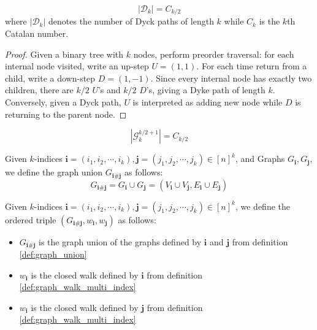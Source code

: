 \begin{proposition}
  \notready
  \label{prop:Catalan_Dyck_samecardinality}
  \[|\mathcal{D}_k| = C_{k/2} \] where $|\mathcal{D}_k|$ denotes the number of Dyck paths of length $k$ while
  $C_k$ is the $k$th Catalan number.
\end{proposition}

\begin{proof}
  \notready
  Given a binary tree with $k$ nodes, perform preorder traversal: for each internal node visited, write
  an up-step \(U = (1,1)\). For each time return from a child, write a down-step \(D = (1,-1)\).
  Since every internal node has exactly two children, there are \(k/2\) \(U\)'s and \(k/2\) \(D\)'s,
  giving a Dyke path of length \(k\). Conversely, given a Dyck path, $U$ is interpreted as adding new node
  while $D$ is returning to the parent node.
\end{proof}


\begin{proposition}
    \notready
    \label{prop:graph_Catalan_number}
  \[|\mathcal{G}^{k/2 + 1}_k| = C_{k/2}\]
\end{proposition}


\begin{definition}
  \label{def:graph_union}
  \notready
  Given $k$-indices $\mathbf{i} = (i_1, i_2, \cdots , i_{k}), \mathbf{j} = (j_1, j_2, \cdots , j_{k}) \in [n]^{k}$,
  and Graphs $G_{\mathbf{i}}, G_{\mathbf{j}}$, we define the graph union $G_{\mathbf{i} \# \mathbf{j}}$ as follows:
  $$
  G_{\mathbf{i} \# \mathbf{j}}  = G_{\mathbf{i}} \cup G_{\mathbf{j}} = (V_{\mathbf{i}} \cup V_{\mathbf{j}}, E_{\mathbf{i}} \cup E_{\mathbf{j}})
  $$
\end{definition}


\begin{definition}
  \label{def:ordered_triple}
  \notready
  Given $k$-indices $\mathbf{i} = (i_1, i_2, \cdots , i_{k}), \mathbf{j} = (j_1, j_2, \cdots , j_{k}) \in [n]^{k}$,
  we define the ordered triple $(G_{\mathbf{i} \# \mathbf{j}}, w_{\mathbf{i}}, w_{\mathbf{j}})$ as follows:
  \begin{itemize}
      \item $G_{\mathbf{i} \# \mathbf{j}}$ is the graph union of the graphs defined by $\mathbf{i}$ and $\mathbf{j}$ from definition \ref{def:graph_union}
      \item $w_{\mathbf{i}}$ is the closed walk defined by $\mathbf{i}$ from definition \ref{def:graph_walk_multi_index}
      \item $w_{\mathbf{i}}$ is the closed walk defined by $\mathbf{j}$ from definition \ref{def:graph_walk_multi_index}
  \end{itemize}
\end{definition}


